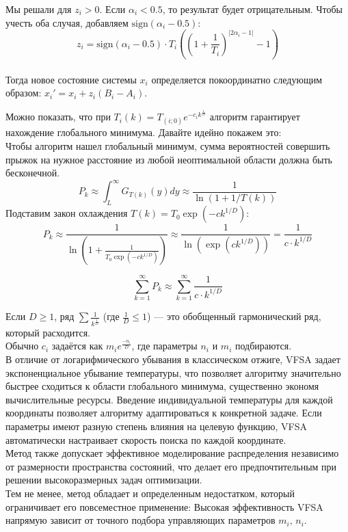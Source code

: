 Мы решали для $z_i > 0$. Если $\alpha_i < 0.5$, то результат будет отрицательным. Чтобы учесть оба случая, добавляем $\text{sign}(\alpha_i - 0.5)$:
$$z_i = \text{sign}(\alpha_i - 0.5) \cdot T_i \left( \left(1 + \frac{1}{T_i}\right)^{|2\alpha_i - 1|} - 1 \right)$$ \\

\noindent Тогда новое состояние системы $x_i$ определяется покоординатно следующим образом: 
$x_i' = x_i + z_i(B_i-A_i)$.

\noindent Можно показать, что при $T_i(k) = T_{(i; 0)}e^{-c_ik^{\frac{1}{D}}}$ алгоритм гарантирует нахождение глобального минимума. Давайте идейно покажем это:  \\

\noindent  Чтобы алгоритм нашел глобальный минимум, сумма вероятностей совершить прыжок на нужное расстояние из любой неоптимальной области должна быть бесконечной. \\
$$P_k \approx \int_{L}^{\infty} G_{T(k)}(y) dy \approx \frac{1}{\ln(1 + 1/T(k))}$$
Подставим закон охлаждения $T(k) = T_0 \exp(-c k^{1/D})$:
$$P_k \approx \frac{1}{\ln(1 + \frac{1}{T_0 \exp(-c k^{1/D})})} \approx \frac{1}{\ln(\exp(c k^{1/D}))} = \frac{1}{c \cdot k^{1/D}}$$

$$\sum_{k=1}^{\infty} P_k \approx \sum_{k=1}^{\infty} \frac{1}{c \cdot k^{1/D}}$$

Если $D \ge 1$, ряд $\sum \frac{1}{k^{\frac{1}{D}}}$ (где $\frac{1}{D} \leq 1$) — это обобщенный гармонический ряд, который расходится. \\
Обычно $c_i$ задаётся как $m_ie^{\frac{-n_i}{D}}$, где параметры $n_i$ и $m_i$ подбираются. \\

\noindent В отличие от логарифмического убывания в классическом отжиге, VFSA задает экспоненциальное убывание температуры, что позволяет алгоритму значительно быстрее сходиться к области глобального минимума, существенно экономя вычислительные ресурсы. Введение индивидуальной температуры для каждой координаты позволяет алгоритму адаптироваться к конкретной задаче. Если параметры имеют разную степень влияния на целевую функцию, VFSA автоматически настраивает скорость поиска по каждой координате.\\
Метод также допускает эффективное моделирование распределения независимо от размерности пространства состояний, что делает его предпочтительным при решении высокоразмерных задач оптимизации. \\
Тем не менее, метод обладает и определенным недостатком, который ограничивает его повсеместное применение:
Высокая эффективность VFSA напрямую зависит от точного подбора управляющих параметров $m_i, \, n_i$. 
